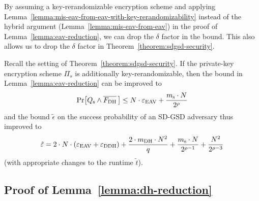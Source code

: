 By assuming a key-rerandomizable encryption scheme and applying Lemma~\ref{lemma:mis-eav-from-eav-with-key-rerandomizability} instead of the hybrid argument (Lemma~\ref{lemma:mis-eav-from-eav}) in the proof of Lemma~\ref{lemma:eav-reduction}, we can drop the $\delta$ factor in the bound. This also allows us to drop the $\delta$ factor in Theorem~\ref{theorem:sdgsd-security}.

\begin{corollary}
	Recall the setting of Theorem~\ref{theorem:sdgsd-security}. If the private-key encryption scheme $\Pi_s$ is additionally key-rerandomizable, then the bound in Lemma~\ref{lemma:eav-reduction} can be improved to
	\[
		\pr{\qs \land \overline{\fdh}\,} \le N \cdot \eeav + \frac{\ms \cdot N}{2^\rho}
	\]
	and the bound $\tilde{\epsilon}$ on the success probability of an SD-GSD adversary thus improved to
	\[
		\tilde{\varepsilon} = 2 \cdot N \cdot (\varepsilon_\mathrm{EAV} + \varepsilon_\mathrm{DDH}) + \frac{2 \cdot m_\mathrm{DH} \cdot N^2}{q} + \frac{m_\mathrm{s} \cdot N}{2^{\rho - 1}} + \frac{N^2}{2^{\rho - 3}}
	\]
	(with appropriate changes to the runtime $\tilde{t}$).
\end{corollary}

\subsection{Proof of Lemma~\ref{lemma:dh-reduction}} \label{sec:dh-reduction-proof}


